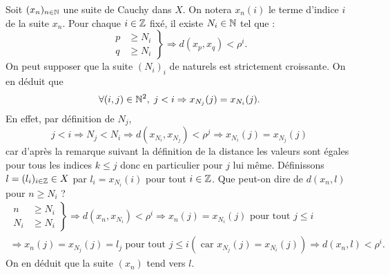 \begin{demo}
 Soit $(x_n)_{n\in \mathbb{N}}$ une suite de Cauchy dans $X$. On notera $x_n(i)$ le terme d'indice $i$ de la suite $x_n$.\newline
 Pour chaque $i\in \mathbb{Z}$ fixé, il existe $N_i \in \mathbb{N}$ tel que :
 \begin{displaymath}
 \left.
 \begin{aligned}
   p &\geq N_i \\
   q &\geq N_i
 \end{aligned}
 \right\rbrace
 \Rightarrow
  d(x_p,x_q) < \rho^i.
 \end{displaymath}
On peut supposer que la suite $(N_i)_i$ de naturels est strictement croissante. On en déduit que
\begin{displaymath}
 \forall (i,j) \in \mathbb{N}^2, \; j < i \Rightarrow x_{N_j}(j) = x_{N_i}(j).
\end{displaymath}
En effet, par définition de $N_j$,
\begin{displaymath}
 j< i \Rightarrow N_j < N_i \Rightarrow d(x_{N_i},x_{N_j}) < \rho^j
 \Rightarrow x_{N_i}(j) = x_{N_j}(j)
\end{displaymath}
car d'après la remarque suivant la définition de la distance les valeurs sont égales pour tous les indices $k\leq j$ donc en particulier pour $j$ lui même.\newline
Définissons $l=(l_i)_{i\in \mathbb{Z}} \in X$ par $l_i = x_{N_i}(i)$ pour tout $i\in \mathbb{Z}$.\newline
Que peut-on dire de $d(x_n,l)$ pour $n\geq N_i$ ?
\begin{multline*}
 \left.
 \begin{aligned}
  n &\geq N_i \\
  N_i &\geq N_i
 \end{aligned}
 \right\rbrace
 \Rightarrow
 d(x_n,x_{N_i}) < \rho^i
 \Rightarrow
 x_n(j) = x_{N_i}(j) \text{ pour tout } j \leq i \\
 \Rightarrow
 x_n(j) = x_{N_j}(j)=l_j \text{ pour tout } j \leq i \left(\text{ car } x_{N_j}(j) = x_{N_i}(j)\right)
 \Rightarrow d(x_n,l) < \rho^i .
\end{multline*}
On en déduit que la suite $(x_n)$ tend vers $l$.
\end{demo}

